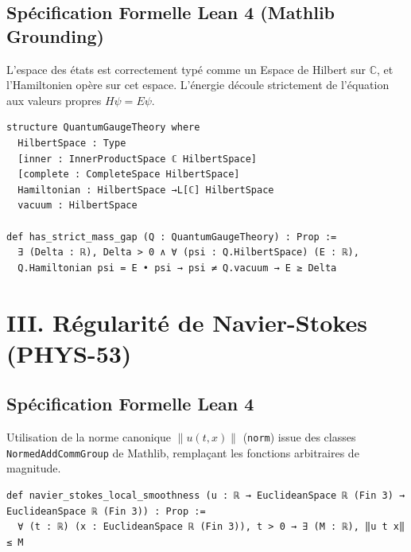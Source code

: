 \documentclass[11pt, a4paper]{article}
\begin{document}
\subsection{Spécification Formelle Lean 4 (Mathlib Grounding)}
L'espace des états est correctement typé comme un Espace de Hilbert sur $\mathbb{C}$, et l'Hamiltonien opère sur cet espace. L'énergie découle strictement de l'équation aux valeurs propres $H \psi = E \psi$.
\begin{lstlisting}[language=Lean]
structure QuantumGaugeTheory where
  HilbertSpace : Type
  [inner : InnerProductSpace ℂ HilbertSpace]
  [complete : CompleteSpace HilbertSpace]
  Hamiltonian : HilbertSpace →L[ℂ] HilbertSpace
  vacuum : HilbertSpace

def has_strict_mass_gap (Q : QuantumGaugeTheory) : Prop :=
  ∃ (Delta : ℝ), Delta > 0 ∧ ∀ (psi : Q.HilbertSpace) (E : ℝ), 
  Q.Hamiltonian psi = E • psi → psi ≠ Q.vacuum → E ≥ Delta
\end{lstlisting}

\section{III. Régularité de Navier-Stokes (PHYS-53)}
\subsection{Spécification Formelle Lean 4}
Utilisation de la norme canonique $\lVert u(t,x) \rVert$ (\texttt{norm}) issue des classes \texttt{NormedAddCommGroup} de Mathlib, remplaçant les fonctions arbitraires de magnitude.
\begin{lstlisting}[language=Lean]
def navier_stokes_local_smoothness (u : ℝ → EuclideanSpace ℝ (Fin 3) → EuclideanSpace ℝ (Fin 3)) : Prop :=
  ∀ (t : ℝ) (x : EuclideanSpace ℝ (Fin 3)), t > 0 → ∃ (M : ℝ), ‖u t x‖ ≤ M
\end{lstlisting}
\end{document}
